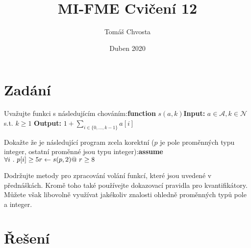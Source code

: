 \documentclass{article}
\title{MI-FME Cvičení 12}
\author{Tomáš Chvosta}
\date{Duben 2020}
\begin{document}
\maketitle

\section{Zadání}
Uvažujte funkci s následujícím chováním:\newline\newline \textbf{function} $s(a,k)$\newline \textbf{Input:} $a \in \mathcal{A}, k \in \mathcal{N}$ s.t. $k \geq 1$ \newline \textbf{Output:} $1 + \sum_{i \in \{0,...,k-1\}}^{} a[i]$ \newline

Dokažte že je následující program zcela korektní ($p$ je pole proměnných typu integer, ostatní proměnné jsou typu integer):\newline\newline \textbf{assume} $\forall i\ .\ p[i] \geq 5 \newline r \leftarrow s(p,2) \newline @\ r \geq 8$ \newline

Dodržujte metody pro zpracování volání funkcí, které jsou uvedené v přednáškách. Kromě toho také používejte dokazovací pravidla pro kvantifikátory. Můžete však libovolně využívat jakékoliv znalosti ohledně proměnných typů pole a integer.

\section{Řešení}
\end{document}
